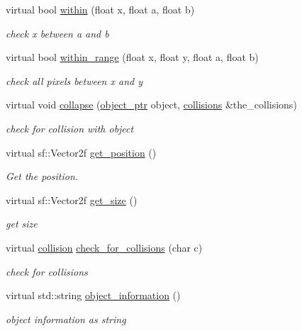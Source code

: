 \begin{DoxyCompactItemize}
virtual bool \hyperlink{classdrawable_a0d3278e4e888fc8289468e8893dd8329}{within} (float x, float a, float b)
\begin{DoxyCompactList}\small\item\em check x between a and b \end{DoxyCompactList}\item 
virtual bool \hyperlink{classdrawable_ab5c0e1af885f214bc9ef0da47cdb5ac9}{within\+\_\+range} (float x, float y, float a, float b)
\begin{DoxyCompactList}\small\item\em check all pixels between x and y \end{DoxyCompactList}\item 
virtual void \hyperlink{classdrawable_af0ddd3660d258629598dc76b31d1cc49}{collapse} (\hyperlink{drawable_8hpp_aab5add95f06d2ba25dbfed8eb07274fa}{object\+\_\+ptr} object, \hyperlink{drawable_8hpp_a7e1a7f34f6d09dabb4cdafd6e4118603}{collisions} \&the\+\_\+collisions)
\begin{DoxyCompactList}\small\item\em check for collision with object \end{DoxyCompactList}\item 
virtual sf\+::\+Vector2f \hyperlink{classdrawable_a6a31ea381be2964d0115b782a66d3414}{get\+\_\+position} ()
\begin{DoxyCompactList}\small\item\em Get the position. \end{DoxyCompactList}\item 
virtual sf\+::\+Vector2f \hyperlink{classdrawable_a58cb3ab0406d40e9cea3aefac1e4bf05}{get\+\_\+size} ()
\begin{DoxyCompactList}\small\item\em get size \end{DoxyCompactList}\item 
virtual \hyperlink{structcollision}{collision} \hyperlink{classdrawable_abbc6e0089d502ba48c3fcb9c96e3966e}{check\+\_\+for\+\_\+collisions} (char c)
\begin{DoxyCompactList}\small\item\em check for collisions \end{DoxyCompactList}\item 
virtual std\+::string \hyperlink{classdrawable_a2ed0f8bb53f33477f7722efa7bb24583}{object\+\_\+information} ()
\begin{DoxyCompactList}\small\item\em object information as string \end{DoxyCompactList}\item 

\end{DoxyCompactItemize}
